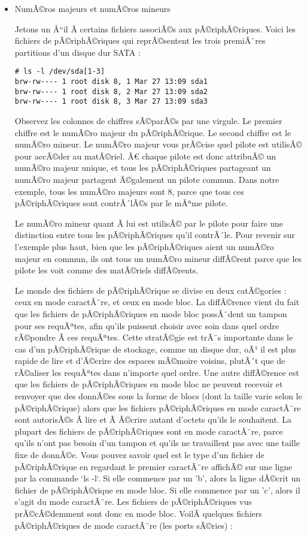 \documentclass[11pt]{article}
\begin{document}
\begin{itemize}
\item NumÃ©ros majeurs et numÃ©ros mineurs
\label{sec-5-6-0-1}

Jetons un Å“il Ã  certains fichiers associÃ©s aux pÃ©riphÃ©riques.
Voici les fichiers de pÃ©riphÃ©riques qui reprÃ©sentent les trois premiÃ¨res partitions d'un disque dur SATA :

\begin{verbatim}
# ls -l /dev/sda[1-3]
brw-rw---- 1 root disk 8, 1 Mar 27 13:09 sda1
brw-rw---- 1 root disk 8, 2 Mar 27 13:09 sda2
brw-rw---- 1 root disk 8, 3 Mar 27 13:09 sda3
\end{verbatim}

Observez les colonnes de chiffres sÃ©parÃ©s par une virgule. Le premier chiffre est le numÃ©ro majeur du pÃ©riphÃ©rique. Le second chiffre est le numÃ©ro mineur. Le numÃ©ro majeur vous prÃ©cise quel pilote est utilisÃ© pour accÃ©der au matÃ©riel. Ã€ chaque pilote est donc attribuÃ© un numÃ©ro majeur unique, et tous les pÃ©riphÃ©riques partageant un numÃ©ro majeur partagent Ã©galement un pilote commun. Dans notre exemple, tous les numÃ©ro majeurs sont 8, parce que tous ces pÃ©riphÃ©riques sont contrÃ´lÃ©s par le mÃªme pilote.

Le numÃ©ro mineur quant Ã  lui est utilisÃ© par le pilote pour faire une distinction entre tous les pÃ©riphÃ©riques qu'il contrÃ´le. Pour revenir sur l'exemple plus haut, bien que les pÃ©riphÃ©riques aient un numÃ©ro majeur en commun, ils ont tous un numÃ©ro mineur diffÃ©rent parce que les pilote les voit comme des matÃ©riels diffÃ©rents.

Le monde des fichiers de pÃ©riphÃ©rique se divise en deux catÃ©gories : ceux en mode caractÃ¨re, et ceux en mode bloc. La diffÃ©rence vient du fait que les fichiers de pÃ©riphÃ©riques en mode bloc possÃ¨dent un tampon pour ses requÃªtes, afin qu'ils puissent choisir avec soin dans quel ordre rÃ©pondre Ã  ces requÃªtes. Cette stratÃ©gie est trÃ¨s importante dans le cas d'un pÃ©riphÃ©rique de stockage, comme un disque dur, oÃ¹ il est plus rapide de lire et d'Ã©crire des espaces mÃ©moire voisins, plutÃ´t que de rÃ©aliser les requÃªtes dans n'importe quel ordre. Une autre diffÃ©rence est que les fichiers de pÃ©riphÃ©riques en mode bloc ne peuvent recevoir et renvoyer que des donnÃ©es sous la forme de blocs (dont la taille varie selon le pÃ©riphÃ©rique) alors que les fichiers pÃ©riphÃ©riques en mode caractÃ¨re sont autorisÃ©s Ã  lire et Ã  Ã©crire autant d'octets qu'ils le souhaitent. La plupart des fichiers de pÃ©riphÃ©riques sont en mode caractÃ¨re, parce qu'ils n'ont pas besoin d'un tampon et qu'ils ne travaillent pas avec une taille fixe de donnÃ©e. Vous pouvez savoir quel est le type d'un fichier de pÃ©riphÃ©rique en regardant le premier caractÃ¨re affichÃ© sur une ligne par la commande `ls -l`. Si elle commence par un 'b', alors la ligne dÃ©crit un fichier de pÃ©riphÃ©rique en mode bloc. Si elle commence par un 'c', alors il s'agit du mode caractÃ¨re. Les fichiers de pÃ©riphÃ©riques vus prÃ©cÃ©demment sont donc en mode bloc. VoilÃ  quelques fichiers pÃ©riphÃ©riques de mode caractÃ¨re (les ports sÃ©ries) :


\end{itemize}
\end{document}
